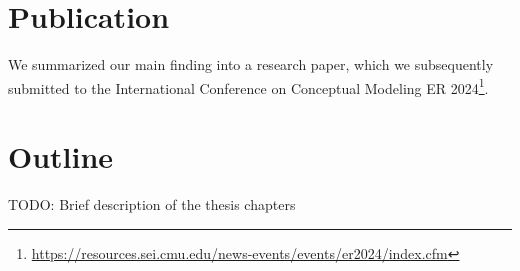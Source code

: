 \section*{Publication}
We summarized our main finding into a research paper, which we subsequently submitted to the International Conference on Conceptual Modeling ER 2024\footnote{\url{https://resources.sei.cmu.edu/news-events/events/er2024/index.cfm}}.


\section*{Outline}
TODO: Brief description of the thesis chapters